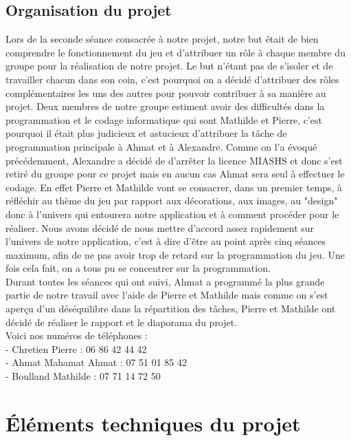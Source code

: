 \documentclass{article}
\begin{document}
\subsection{Organisation du projet}


Lors de la seconde séance consacrée à notre projet, notre but était de bien comprendre le fonctionnement du jeu et d'attribuer un rôle à chaque membre du groupe pour la réalisation de notre projet. Le but n'étant pas de s'isoler et de travailler chacun dans son coin, c'est pourquoi on a décidé d'attribuer des rôles complémentaires les uns des autres pour pouvoir contribuer à sa manière au projet. Deux membres de notre groupe estiment avoir des difficultés dans la programmation et le codage informatique qui sont Mathilde et Pierre, c'est pourquoi il était plus judicieux et astucieux d'attribuer la tâche de programmation principale à Ahmat et à Alexandre. Comme on l'a évoqué précédemment, Alexandre a décidé de d'arrêter la licence MIASHS et donc s'est retiré du groupe pour ce projet mais en aucun cas Ahmat sera seul à effectuer le codage. En effet Pierre et Mathilde vont se consacrer, dans un premier temps, à réfléchir au thème du jeu par rapport aux décorations, aux images, au "design" donc à l'univers qui entourera notre application et à comment procéder pour le réaliser. Nous avons décidé de nous mettre d'accord assez rapidement sur l'univers de notre application, c'est à dire d'être au point après cinq séances maximum, afin de ne pas avoir trop de retard sur la programmation du jeu. Une fois cela fait, on a tous pu se concentrer sur la programmation. \\
Durant toutes les séances qui ont suivi, Ahmat a programmé la plus grande partie de notre travail avec l'aide de Pierre et Mathilde mais comme on s'est aperçu d'un déséquilibre dans la répartition des tâches, Pierre et Mathilde ont décidé de réaliser le rapport et le diaporama du projet. \\
Voici nos numéros de téléphones : \\
- Chretien Pierre : 06 86 42 44 42 \\
- Ahmat Mahamat Ahmat : 07 51 01 85 42 \\
- Boulland Mathilde : 07 71 14 72 50


\section{Éléments techniques du projet}
 
\end{document}
